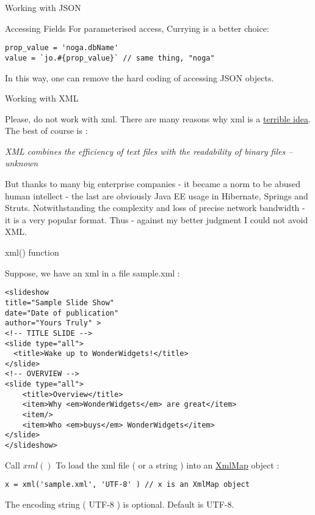 \begin{section}{Working with JSON}
\begin{subsection}{Accessing Fields}
For parameterised access, Currying is a better choice:

\begin{lstlisting}[style=JexlStyle]
prop_value = 'noga.dbName'  
value = `jo.#{prop_value}` // same thing, "noga"
\end{lstlisting}
In this way, one can remove the hard coding of accessing JSON objects.
\end{subsection}

\end{section}

\begin{section}{Working with XML}

Please, do not work with xml. 
There are many reasons why xml is a \href{http://harmful.cat-v.org/software/xml}{terrible idea}.
The best of course is :
\begin{center}
\emph{
XML combines the efficiency of text files with the readability of binary files
 -- unknown
 }
\end{center}

But thanks to many big enterprise companies - it became a norm to be abused human intellect - the last are obviously Java EE usage in Hibernate, Springs and Struts. Notwithstanding the complexity and loss of precise network bandwidth - it is a very popular format. 
Thus - against my better judgment I could not avoid XML.

\begin{subsection}{xml() function}

Suppose, we have an xml in a file sample.xml :
\begin{lstlisting}[style=xmlStyle]
<slideshow 
title="Sample Slide Show"
date="Date of publication"
author="Yours Truly" >
<!-- TITLE SLIDE -->
<slide type="all">
  <title>Wake up to WonderWidgets!</title>
</slide>
<!-- OVERVIEW -->
<slide type="all">
    <title>Overview</title>
    <item>Why <em>WonderWidgets</em> are great</item>
    <item/>
    <item>Who <em>buys</em> WonderWidgets</item>
</slide>
</slideshow>
\end{lstlisting}
Call $xml()$ To load the xml file ( or a string ) into an 
\href{https://github.com/nmondal/njexl/blob/master/lang/src/main/java/com/noga/njexl/lang/extension/dataaccess/XmlMap.java}{XmlMap} object :
\begin{lstlisting}[style=JexlStyle]
x = xml('sample.xml', 'UTF-8' ) // x is an XmlMap object
\end{lstlisting}
The encoding string ( UTF-8 ) is optional. 
Default is UTF-8. 


\end{subsection}
\end{section}
